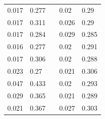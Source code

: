 \documentclass{article}
\begin{document}
\begin{table}[H]
\begin{tabular}{|p{4cm}|p{4cm}|p{0cm}|p{4cm}|p{4cm}|}
0.017 & 0.277 & & 0.02 & 0.29 \\ \cline{1-5}
0.017 & 0.311 & & 0.026 & 0.29 \\ \cline{1-5}
0.017 & 0.284 & & 0.029 & 0.285 \\ \cline{1-5}
0.016 & 0.277 & & 0.02 & 0.291 \\ \cline{1-5}
0.017 & 0.306 & & 0.02 & 0.288 \\ \cline{1-5}
0.023 & 0.27 & & 0.021 & 0.306 \\ \cline{1-5}
0.047 & 0.433 & & 0.02 & 0.293 \\ \cline{1-5}
0.029 & 0.365 & & 0.021 & 0.289 \\ \cline{1-5}
0.021 & 0.367 & & 0.027 & 0.303 \\ \cline{1-5}
\end{tabular}
\end{table}
\end{document}
